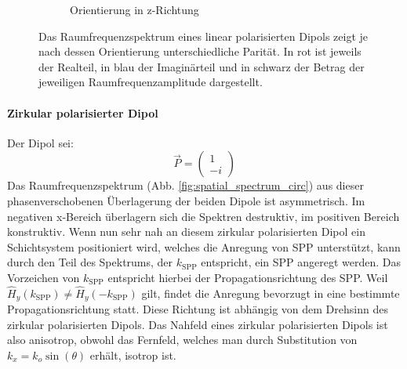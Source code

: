 \documentclass[a4paper, titlepage,  ngerman, fullpage]{book}
\begin{document}
\begin{figure}
\begin{subfigure}{0.5\textwidth}
			\caption{Orientierung in z-Richtung}
			\label{fig:spatial_spectrum_z}
		\end{subfigure}		
		\caption[Raumfrequenzspektrum linear polarisierter Dipol]{Das Raumfrequenzspektrum eines linear polarisierten Dipols zeigt je nach  dessen Orientierung unterschiedliche Parität. In rot ist jeweils der Realteil, in blau der Imaginärteil und in schwarz der Betrag der jeweiligen Raumfrequenzamplitude dargestellt.}		
	\end{figure}
	\paragraph{Zirkular polarisierter Dipol}
	Der Dipol sei:
	$$\vec{P} = \begin{pmatrix} 1 \\ -i\end{pmatrix}$$
	Das Raumfrequenzspektrum (Abb. \ref{fig:spatial_spectrum_circ}) aus dieser phasenverschobenen Überlagerung der beiden Dipole ist asymmetrisch.  Im negativen x-Bereich überlagern sich die Spektren destruktiv, im positiven Bereich konstruktiv. Wenn nun sehr nah an diesem zirkular polarisierten Dipol ein Schichtsystem positioniert wird, welches die Anregung von SPP unterstützt, kann durch den Teil des Spektrums, der $k_{\mathrm{SPP}}$ entspricht, ein SPP angeregt werden. Das Vorzeichen von $k_{\mathrm{SPP}}$ entspricht hierbei der Propagationsrichtung des SPP. Weil $\hat{H}_y(k_{\mathrm{SPP}}) \neq \hat{H}_y( -k_{\mathrm{SPP}}) $ gilt, findet die Anregung bevorzugt in eine bestimmte Propagationsrichtung statt. Diese Richtung ist abhängig von dem Drehsinn des zirkular polarisierten Dipols.			
	Das Nahfeld eines zirkular polarisierten Dipols ist also anisotrop, obwohl das Fernfeld, welches man durch Substitution von $k_x = k_o \sin(\theta)$ erhält, isotrop ist.
	
\end{document}
